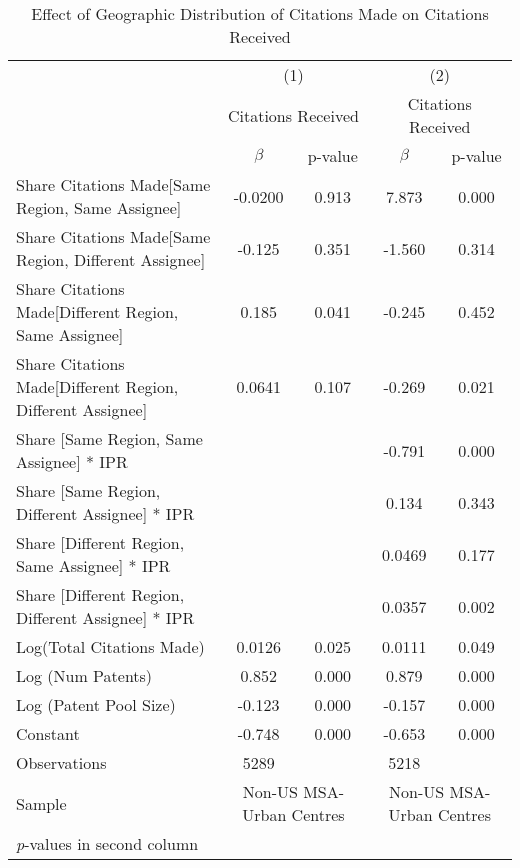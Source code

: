 {
\begin{longtable}{l*{2}{cc}}
\caption{Effect of Geographic Distribution of Citations Made on Citations Received \label{model24}}\\
\hline\hline\endfirsthead\hline\endhead\hline\endfoot\endlastfoot
                &\multicolumn{2}{c}{(1)}&\multicolumn{2}{c}{(2)}\\
                &\multicolumn{2}{c}{Citations Received}&\multicolumn{2}{c}{Citations Received}\\
                &$\beta$&p-value&$\beta$&p-value\\
\hline
Share Citations Made[Same Region, Same Assignee]&  -0.0200&    0.913&    7.873&    0.000\\
Share Citations Made[Same Region, Different Assignee]&   -0.125&    0.351&   -1.560&    0.314\\
Share Citations Made[Different Region, Same Assignee]&    0.185&    0.041&   -0.245&    0.452\\
Share Citations Made[Different Region, Different Assignee]&   0.0641&    0.107&   -0.269&    0.021\\
Share [Same Region, Same Assignee] * IPR&         &         &   -0.791&    0.000\\
Share [Same Region, Different Assignee] * IPR&         &         &    0.134&    0.343\\
Share [Different Region, Same Assignee] * IPR&         &         &   0.0469&    0.177\\
Share [Different Region, Different Assignee] * IPR&         &         &   0.0357&    0.002\\
Log(Total Citations Made)&   0.0126&    0.025&   0.0111&    0.049\\
Log (Num Patents)&    0.852&    0.000&    0.879&    0.000\\
Log (Patent Pool Size)&   -0.123&    0.000&   -0.157&    0.000\\
Constant        &   -0.748&    0.000&   -0.653&    0.000\\
\hline
Observations    &     5289&         &     5218&         \\
Sample          &\multicolumn{2}{c}{Non-US MSA-Urban Centres}&\multicolumn{2}{c}{Non-US MSA-Urban Centres}         \\
\hline\hline
\multicolumn{5}{l}{\footnotesize \textit{p}-values in second column}\\
\end{longtable}
}
